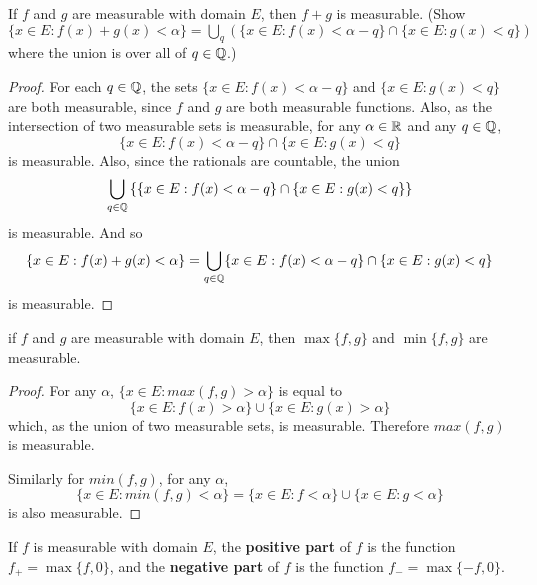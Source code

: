 \begin{pblm}%
	If $f$ and $g$ are measurable with domain $E$, then $f + g$ is measurable. 
	(Show $\{x \in E: f(x) + g(x) < \alpha\} = \bigcup\limits_{q} 
	(\{x \in E: f(x) < \alpha - q\} \cap \{x \in E: g(x) < q\})$ where the 
	union is over all of $q \in \mathbb{Q}$.)

\begin{proof}
	For each $q \in \mathbb{Q}$, the sets $\{x \in E: f(x) < \alpha - q\}$ and 
	$\{x \in E: g(x) < q\}$ are both measurable, since $f$ and $g$ are 
	both measurable functions. Also, as the intersection of two measurable 
	sets is measurable, for any $\alpha \in \mathbb{R}$ and any $q \in \mathbb{Q}$, 
	\begin{equation*}
		\{x \in E: f(x) < \alpha - q\} \cap \{x \in E: g(x) < q\}
	\end{equation*}
	is measurable.  Also, since the rationals are countable, the union 
	\begin{equation*}
		\bigcup\limits_{q \in \mathbb{Q}}\left\{\{x \in E: f(x) < \alpha - q\} \cap \{x \in E: g(x) < q\}\right\}
	\end{equation*}
	is measurable. 
	And so 
	\begin{equation*}
		\{x \in E: f(x) + g(x) < \alpha\} = 
		\bigcup\limits_{q \in \mathbb{Q}}\{x \in E: f(x) < \alpha - q\} 
		\cap \{x \in E: g(x) < q\} 
	\end{equation*}
	is measurable. 
\end{proof}
\end{pblm}

\begin{pblm}%
	if $f$ and $g$ are measurable with domain $E$, then $\max\{f,g\}$ and 
	$\min\{f,g\}$ are measurable.
\begin{proof}
	For any $\alpha$, $\{x \in E: max(f, g) > \alpha\}$ is equal to 
	\begin{equation*}
		\{x \in E: f(x) > \alpha\} \cup \{x \in E: g(x) > \alpha\}
	\end{equation*}
	which, as the union of two measurable sets, is measurable. Therefore 
	$max(f, g)$ is measurable. 

	Similarly for $min(f, g)$, for any $\alpha$, 
	\begin{equation*}
		\{x \in E: min(f, g) < \alpha\} = \{x \in E: f < \alpha \} \cup \{x \in E: g < \alpha\}
	\end{equation*}
	is also measurable. 
\end{proof}
\end{pblm}

\begin{defn}\label{d:pos_neg_fun}%
	If $f$ is measurable with domain $E$, the \textbf{positive part} of $f$ is 
	the function $f_+ = \max\{f,0\}$, and the \textbf{negative part} of $f$ is 
	the function $f_- = \max\{-f,0\}$. 
\end{defn}

